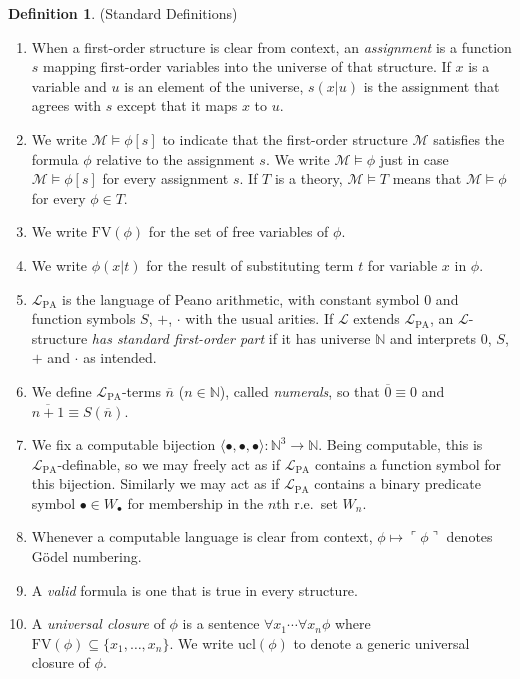\documentclass[reqno]{article}
\theoremstyle{definition}
\newtheorem{definition}[theorem]{Definition}
\def\N{\mathbb{N}}
\def\L{\mathscr{L}}
\def\M{\mathscr{M}}
\def\FV{\mathrm{FV}}
\def\LPA{\L_{\mathrm{PA}}}
\newcommand{\ucl}[1]{\mathrm{ucl}(#1)}
\begin{document}
\begin{definition}
\label{stddefn}
(Standard Definitions)
\begin{enumerate}
\item When a first-order structure is clear from context, an \emph{assignment} is a 
function $s$ mapping first-order variables into the universe of that structure.  If 
$x$ is a variable and $u$ is an element of the universe, $s(x|u)$ is the 
assignment that agrees with $s$ except that it maps $x$ to $u$.
\item We write $\M\models\phi[s]$ to indicate that the first-order structure $\M$ 
satisfies the formula $\phi$ relative to the assignment $s$.  We write 
$\M\models \phi$ just in case $\M\models\phi[s]$ for every assignment $s$.
If $T$ is a theory, $\M\models T$ means that $\M\models\phi$ for every 
$\phi\in T$.
\item We write $\FV(\phi)$ for the set of free variables of $\phi$.
\item We write $\phi(x|t)$ for the result of substituting term $t$ for 
variable $x$ in $\phi$.
\item $\LPA$ is the language of Peano arithmetic, with constant 
symbol $0$ and function symbols $S$, $+$, $\cdot$ with the usual arities.
If $\L$ extends $\LPA$, an $\L$-structure \emph{has standard 
first-order part} if it has universe $\N$ and interprets $0$, $S$, $+$ and 
$\cdot$ as intended.
\item We define $\LPA$-terms $\overline n$ ($n\in\N$), called 
\emph{numerals}, so that $\overline 0 \equiv 0$ and $\overline{n+1}\equiv S(\overline 
n)$.
\item We fix a computable bijection 
$\langle 
\bullet,\bullet,\bullet\rangle:\N^3\to\N$.
Being computable, this is $\LPA$-definable, so we may freely 
act as if $\LPA$ contains a function symbol for this bijection. 
Similarly we may act as if $\LPA$ contains a binary predicate symbol $\bullet\in 
W_\bullet$ for membership in the $n$th r.e.~set $W_n$.
\item Whenever a computable language is clear from context, 
$\phi\mapsto\ulcorner\phi\urcorner$ denotes G\"odel numbering.
\item A \emph{valid} formula is one that is true in every structure.
\item A \emph{universal closure} of $\phi$ is a sentence $\forall 
x_1\cdots \forall x_n\phi$ where $\FV(\phi)\subseteq\{x_1,\ldots,x_n\}$.
We write $\ucl{\phi}$ to denote a generic universal closure of $\phi$.
\end{enumerate}
\end{definition}
\end{document}
